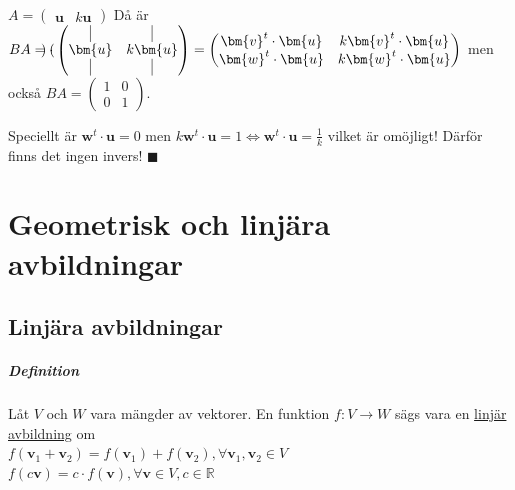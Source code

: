 $A=\begin{pmatrix}\bm{u}&k\bm{u}\end{pmatrix}$
Då är $BA=\begin{pmatrix}
\end{pmatrix} \cdot 
\begin{pmatrix}
    \vline&\vline\\
    \bm{u}&k\bm{u}\\
    \vline&\vline
\end{pmatrix} =
\begin{pmatrix}
    \bm{v}^{t}\cdot\bm{u} & k\bm{v}^{t}\cdot \bm{u}\\
    \bm{w}^{t}\cdot \bm{u} & k\bm{w}^{t}\cdot \bm{u}
\end{pmatrix}$ 
men också 
$BA=\begin{pmatrix}1&0\\0&1\end{pmatrix}$.

Speciellt är  $\bm{w}^{t}\cdot \bm{u}=0$ men $k\bm{w}^{t}\cdot\bm{u}=1\Leftrightarrow \bm{w}^{t}\cdot \bm{u} = \frac{1}{k}$ vilket är omöjligt!
Därför finns det ingen invers! $\blacksquare$

\chapter{Geometrisk och linjära avbildningar}
\section{Linjära avbildningar}

\paragraph{Definition} Låt $V$ och $W$ vara mängder av vektorer.
En funktion $f:V\rightarrow W$ sägs vara en \underline{linjär avbildning} om \\
$f(\bm{v}_{1}+\bm{v}_{2})=f(\bm{v}_{1})+f(\bm{v}_{2}), \forall \bm{v}_{1}, \bm{v}_{2} \in V$\\
$f(c\bm{v})=c\cdot f(\bm{v}), \forall \bm{v}\in V, c\in \mathbb{R}$

